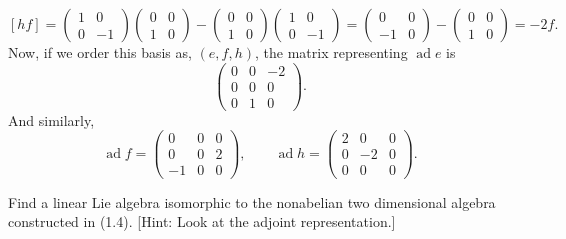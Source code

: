 \documentclass{article}
\newcommand{\lb}[1]{\ensuremath{\left[{#1}\right]}}
\DeclareMathOperator{\ad}{ad}
\begin{document}
\[
    \lb{hf}
    =
    \begin{pmatrix}
        1 & 0 \\
        0 & -1 
    \end{pmatrix}
    \begin{pmatrix}
        0 & 0 \\
        1 & 0 
    \end{pmatrix}
    -
    \begin{pmatrix}
        0 & 0 \\
        1 & 0 
    \end{pmatrix}
    \begin{pmatrix}
        1 & 0 \\
        0 & -1 
    \end{pmatrix}
    =
    \begin{pmatrix}
        0 & 0 \\
        -1 & 0 
    \end{pmatrix}
    -
    \begin{pmatrix}
        0 & 0 \\
        1 & 0 
    \end{pmatrix}
    =
    -2f.
\]
Now, if we order this basis as, $(e, f, h)$, the matrix representing $\ad e$ is
\[
    \begin{pmatrix}
        0 & 0 & -2 \\
        0 & 0 & 0 \\
        0 & 1 & 0 
    \end{pmatrix}.
\]
And similarly,
\[
    \ad f
    =
    \begin{pmatrix}
        0 & 0 & 0 \\
        0 & 0 & 2 \\
        -1 & 0 & 0 
    \end{pmatrix}
    ,\qquad
    \ad h
    =
    \begin{pmatrix}
        2 & 0 & 0 \\
        0 & -2 & 0 \\
        0 & 0 & 0 
    \end{pmatrix}.
\]

\begin{exercise}
    Find a linear Lie algebra isomorphic to the nonabelian two dimensional algebra constructed in (1.4). [Hint: Look at the adjoint representation.]
\end{exercise}
\end{document}
